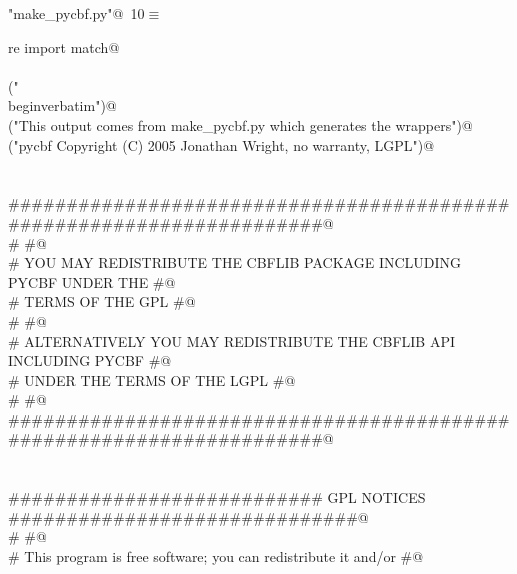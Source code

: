 \documentclass[10pt,a4paper,twoside,notitlepage]{article}
\begin{document}
\begin{flushleft} \small
\begin{minipage}{\linewidth}\label{scrap8}\raggedright\small
{} \verb@"make_pycbf.py"@\nobreak\ {\footnotesize {10}}$\equiv$
\vspace{-1ex}
\begin{list}{}{} \item
\mbox{}\verb@from re import match@\\
\mbox{}\verb@@\\
\mbox{}\verb@print("\\begin{verbatim}")@\\
\mbox{}\verb@print("This output comes from make_pycbf.py which generates the wrappers")@\\
\mbox{}\verb@print("pycbf Copyright (C) 2005  Jonathan Wright, no warranty, LGPL")@\\
\mbox{}\verb@@\\
\mbox{}\verb@@\\
\mbox{}\verb@######################################################################@\\
\mbox{}\verb@#                                                                    #@\\
\mbox{}\verb@# YOU MAY REDISTRIBUTE THE CBFLIB PACKAGE INCLUDING PYCBF UNDER THE  #@\\
\mbox{}\verb@# TERMS OF THE GPL                                                   #@\\
\mbox{}\verb@#                                                                    #@\\
\mbox{}\verb@# ALTERNATIVELY YOU MAY REDISTRIBUTE THE CBFLIB API INCLUDING PYCBF  #@\\
\mbox{}\verb@# UNDER THE TERMS OF THE LGPL                                        #@\\
\mbox{}\verb@#                                                                    #@\\
\mbox{}\verb@######################################################################@\\
\mbox{}\verb@@\\
\mbox{}\verb@@\\
\mbox{}\verb@########################### GPL NOTICES ##############################@\\
\mbox{}\verb@#                                                                    #@\\
\mbox{}\verb@# This program is free software; you can redistribute it and/or      #@\\

\end{list}
\end{minipage}
\end{flushleft}
\end{document}

